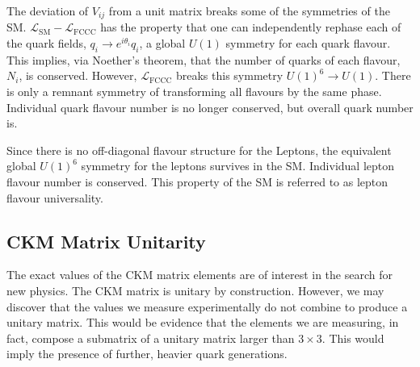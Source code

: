 The deviation of $V_{ij}$ from a unit matrix breaks some of the symmetries of the SM. $\mathcal{L}_{\text{SM}}-\mathcal{L}_{\text{FCCC}}$ has the property that one can independently rephase each of the quark fields, $q_i\to e^{i\theta_i}q_i$, a global $U(1)$ symmetry for each quark flavour. This implies, via Noether's theorem, that the number of quarks of each flavour, $N_i$, is conserved. However, $\mathcal{L}_{\text{FCCC}}$ breaks this symmetry $U(1)^6\to U(1)$. There is only a remnant symmetry of transforming all flavours by the same phase. Individual quark flavour number is no longer conserved, but overall quark number is.

Since there is no off-diagonal flavour structure for the Leptons, the equivalent global $U(1)^6$ symmetry for the leptons survives in the SM. Individual lepton flavour number is conserved. This property of the SM is referred to as lepton flavour universality.

\subsection{CKM Matrix Unitarity}

The exact values of the CKM matrix elements are of interest in the search for new physics. The CKM matrix is unitary by construction. However, we may discover that the values we measure experimentally do not combine to produce a unitary matrix. This would be evidence that the elements we are measuring, in fact, compose a submatrix of a unitary matrix larger than $3\times 3$. This would imply the presence of further, heavier quark generations.




